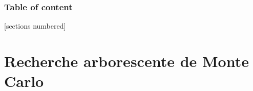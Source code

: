 \documentclass[10pt]{beamer}
\begin{document}
\begin{frame}
\frametitle{Table of content}
[sections numbered]
\tableofcontents
\end{frame}
\section[Recherche arborescente de Monte Carlo \newline
{\footnotesize Monte Carlo Tree Search ou MCTS}]{Recherche arborescente de Monte Carlo}
\end{document}
